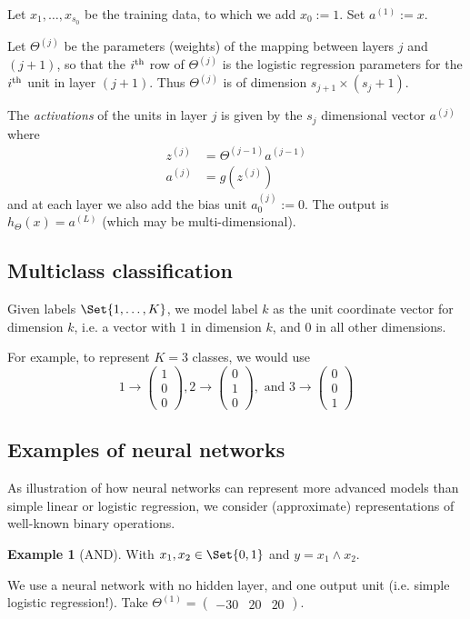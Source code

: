 \documentclass[a4paper,12pt]{article}
\theoremstyle{definition}
\newtheorem*{ex}{Example}
\begin{document}
Let $x_1, \ldots, x_{s_0}$ be the training data, to which we add $x_0 := 1$. Set $a^{(1)} := x$. 

Let $\Theta^{(j)}$ be the parameters (weights) of the mapping between layers $j$ and $(j+1)$, so that the $i\textsuperscript{th}$ row of $\Theta^{(j)}$ is the logistic regression parameters for the $i\textsuperscript{th}$ unit in layer $(j+1)$. Thus $\Theta^{(j)}$ is of dimension $s_{j+1} \times (s_{j} + 1)$.

The \emph{activations} of the units in layer $j$ is given by the $s_j$ dimensional vector $a^{(j)}$ where
\begin{align*}
z^{(j)} &= \Theta^{(j-1)} a^{(j-1)} \\
a^{(j)} &= g(z^{(j)})
\end{align*}
and at each layer we also add the bias unit $a_0^{(j)} := 0$. The output is $h_\Theta(x) = a^{(L)}$ (which may be multi-dimensional).

\subsection{Multiclass classification}
\label{nn-multiclass}
Given labels $\Set{1, \ldots, K}$, we model label $k$ as the unit coordinate vector for dimension $k$, i.e. a vector with $1$ in dimension $k$, and $0$ in all other dimensions.

For example, to represent $K = 3$ classes, we would use 
\[
1 \to \begin{pmatrix} 1 \\ 0 \\ 0 \end{pmatrix},
2 \to \begin{pmatrix} 0 \\ 1 \\ 0 \end{pmatrix}, \text{ and }
3 \to \begin{pmatrix} 0 \\ 0 \\ 1 \end{pmatrix} 
\]

\subsection{Examples of neural networks}
As illustration of how neural networks can represent more advanced models than simple linear or logistic regression, we consider (approximate) representations of well-known binary operations.
\begin{ex}[AND]
With $x_1, x_2 \in \Set{0, 1}$ and $y = x_1 \land x_2$. 

We use a neural network with no hidden layer, and one output unit (i.e. simple logistic regression!). Take $\Theta^{(1)} = \begin{pmatrix} -30 & 20 & 20 \end{pmatrix}$.
\end{ex}
\end{document}

